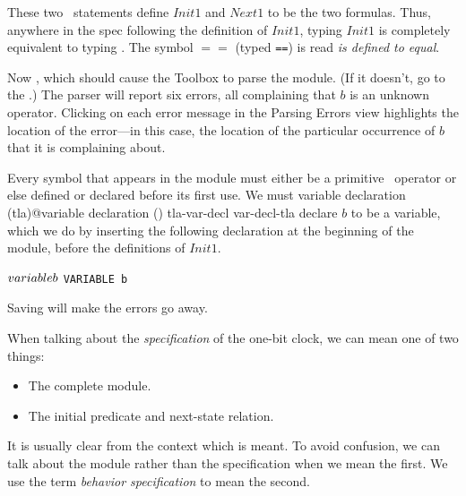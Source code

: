 These two \tlaplus\ statements define $Init1$ and $Next1$ to be the
two formulas.  Thus, anywhere in the spec following the definition of
$Init1$, typing $Init1$ is completely equivalent to typing
.  The symbol $\!==\!$ (typed \verb|==|) is
read \emph{is defined to equal}.

Now , which should cause the
Toolbox to parse the module.  (If it doesn't, go to the
.)  The
parser will report six errors, all complaining that $b$ is an unknown
operator.  Clicking on each error message in the \textsf{Parsing
Errors} view highlights the location of the error---in this case, the
location of the particular occurrence of $b$ that it is complaining
about.

Every symbol that appears in the module must either be a
primitive \tlaplus\ operator or else defined or declared before its
first use.  We must 
   {variable declaration (tla)@variable declaration ()}%
   {tla-var-decl}%
   {var-decl-tla}%
declare $b$ to be a variable, which we do by
inserting the following declaration at the beginning of the module,
before the definitions of $Init1$.%
\begin{display}
\begin{twocols}
$\VARIABLE b$ %
\midcol \verb|VARIABLE b|
\end{twocols}
\end{display}
Saving 
will make the errors go away.

\pause
%
\noindent
%
When talking about the 
\emph{specification} of the one-bit clock, we
can mean one of two things:
\begin{itemize}
\item The complete module.  

\item The initial predicate and next-state relation.
\end{itemize}
It is usually clear from the context which is meant.  To avoid
confusion, we can talk about the module rather than the specification
when we mean the first.  We use the term
\emph{behavior specification} to mean the second.

